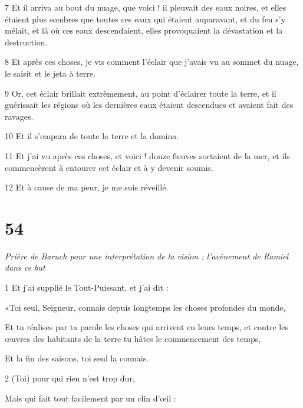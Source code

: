 \par 7 Et il arriva au bout du nuage, que voici ! il pleuvait des eaux noires, et elles étaient plus sombres que toutes ces eaux qui étaient auparavant, et du feu s'y mêlait, et là où ces eaux descendaient, elles provoquaient la dévastation et la destruction.

\par 8 Et après ces choses, je vis comment l'éclair que j'avais vu au sommet du nuage, le saisit et le jeta à terre.

\par 9 Or, cet éclair brillait extrêmement, au point d'éclairer toute la terre, et il guérissait les régions où les dernières eaux étaient descendues et avaient fait des ravages.

\par 10 Et il s'empara de toute la terre et la domina.

\par 11 Et j'ai vu après ces choses, et voici ! douze fleuves sortaient de la mer, et ils commencèrent à entourer cet éclair et à y devenir soumis.

\par 12 Et à cause de ma peur, je me suis réveillé.

\chapter{54}

\par \textit{Prière de Baruch pour une interprétation de la vision : l'avènement de Ramiel dans ce but}


\par 1 Et j'ai supplié le Tout-Puissant, et j'ai dit :

\par «Toi seul, Seigneur, connais depuis longtemps les choses profondes du monde,

\par Et tu réalises par ta parole les choses qui arrivent en leurs temps, et contre les œuvres des habitants de la terre tu hâtes le commencement des temps,

\par Et la fin des saisons, toi seul la connais.

\par 2 (Toi) pour qui rien n'est trop dur,

\par Mais qui fait tout facilement par un clin d'œil :

